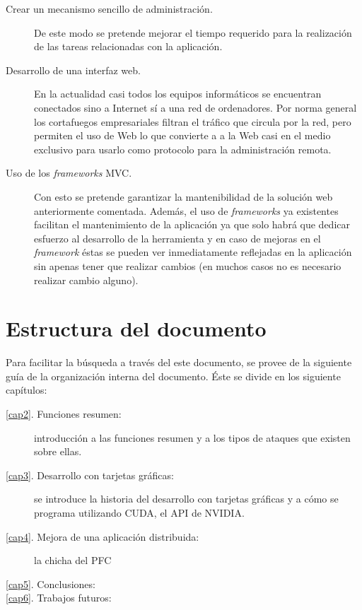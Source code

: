 \begin{description}
	\item[Crear un mecanismo sencillo de administración.] De este modo se pretende mejorar el tiempo requerido para la realización de las tareas relacionadas con la aplicación.
	
	\item[Desarrollo de una interfaz web.] En la actualidad casi todos los equipos informáticos se encuentran conectados sino a Internet sí a una red de ordenadores. Por norma general los cortafuegos empresariales filtran el tráfico que circula por la red, pero permiten el uso de Web lo que convierte a a la Web casi en el medio exclusivo para usarlo como protocolo para la administración remota.
	
	\item[Uso de los \emph{frameworks} MVC.] Con esto se pretende garantizar la mantenibilidad de la solución web anteriormente comentada. Además, el uso de \emph{frameworks} ya existentes facilitan el mantenimiento de la aplicación ya que solo habrá que dedicar esfuerzo al desarrollo de la herramienta y en caso de mejoras en el \emph{framework} éstas se pueden ver inmediatamente reflejadas en la aplicación sin apenas tener que realizar cambios (en muchos casos no es necesario realizar cambio alguno).
\end{description}

\section{Estructura del documento}

Para facilitar la búsqueda a través del este documento, se provee de la siguiente guía de la organización interna del documento. Éste se divide en los siguiente capítulos:

\begin{description}
	\item[\ref{cap2}. Funciones resumen:] introducción a las funciones resumen y a los tipos de ataques que existen sobre ellas.
	\item[\ref{cap3}. Desarrollo con tarjetas gráficas:] se introduce la historia del desarrollo con tarjetas gráficas y a cómo se programa utilizando CUDA, el API de NVIDIA.
	\item[\ref{cap4}. Mejora de una aplicación distribuida:] la chicha del PFC
	\item[\ref{cap5}. Conclusiones:]
	\item[\ref{cap6}. Trabajos futuros:]
\end{description}
